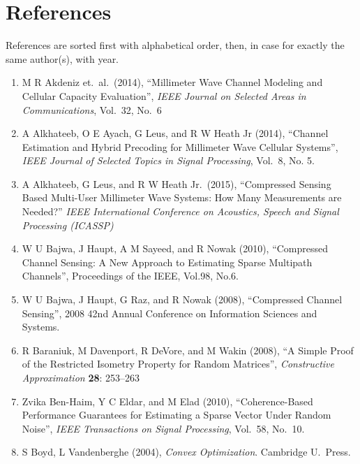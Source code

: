 \documentclass[12pt]{article}
\begin{document}
\section{References}

References are sorted first with alphabetical order, then, in case for exactly the same author(s), with year.

\begin{enumerate}

\item M R Akdeniz et.\ al.\ (2014), ``Millimeter Wave Channel Modeling and Cellular Capacity Evaluation'', \textit{IEEE Journal on Selected Areas in Communications}, Vol.\ 32, No.\ 6

\item A Alkhateeb, O E Ayach, G Leus, and R W Heath Jr (2014), ``Channel Estimation and Hybrid Precoding for Millimeter Wave Cellular Systems'', \textit{IEEE Journal of Selected Topics in Signal Processing}, Vol.\ 8, No. 5.

\item A Alkhateeb, G Leus, and R W Heath Jr.\ (2015), ``Compressed Sensing Based Multi-User Millimeter Wave Systems: How Many Measurements are Needed?'' \textit{IEEE International Conference on Acoustics, Speech and Signal Processing (ICASSP)}

\item W U Bajwa, J Haupt, A M Sayeed, and R Nowak (2010), ``Compressed Channel Sensing: A New Approach to Estimating Sparse Multipath Channels'', Proceedings of the IEEE, Vol.98, No.6.

\item W U Bajwa, J Haupt, G Raz, and R Nowak (2008), ``Compressed Channel Sensing'', 2008 42nd Annual Conference on Information Sciences and Systems.

\item R Baraniuk, M Davenport, R DeVore, and M Wakin (2008), ``A Simple Proof of the Restricted Isometry Property for Random Matrices'', \textit{Constructive Approximation} \textbf{28}: 253–263

\item Zvika Ben-Haim, Y C Eldar, and M Elad (2010), ``Coherence-Based Performance Guarantees for Estimating a Sparse Vector Under Random Noise'', \textit{IEEE Transactions on Signal Processing}, Vol.\ 58, No.\ 10.

\item S Boyd, L Vandenberghe (2004), \textit{Convex Optimization}. Cambridge U.\ Press.


\end{enumerate}
\end{document}

